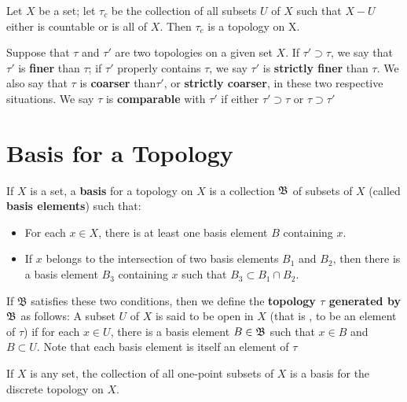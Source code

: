 \begin{exm}
		Let $X$ be a set; let $ \tau_c $ be the collection of all subsets $U$ of $X$ such that $ X - U$ either is countable or is all of $X$. Then $\tau_c$ is a topology on X.
\end{exm}

\begin{define}
	Suppose that $ \tau $ and $ \tau' $ are two topologies on a given set $X$. If $ \tau' \supset \tau $, we say that $ \tau' $ is \textbf{finer} than $ \tau$; if $\tau' $ properly contains $ \tau $, we say $ \tau'$ is \textbf{strictly finer} than $ \tau$. We also say that $ \tau $ is \textbf{coarser} than$ \tau' $, or \textbf{strictly coarser}, in these two respective situations. We say $ \tau $ is \textbf{comparable} with $ \tau' $ if either $ \tau' \supset \tau $ or $ \tau \supset \tau' $
\end{define}
\section*{Basis for a Topology}

\begin{define}
	If $X$ is a set, a \textbf{basis } for a topology on $X$ is a collection $ \mathfrak{B}$ of subsets of $X$ (called \textbf{basis elements}) such that:
	\begin{itemize}
		\item For each $x \in X $, there is at least one basis element $B$ containing $x$.
		\item If $x$ belongs to the intersection of two basis elements $B_1$ and $B_2$, then there is a basis element $B_3$ containing $x$ such that $ B_3 \subset B_1 \cap B_2 $.
	\end{itemize}
	If $\mathfrak{B}$ satisfies these two conditions, then we define the \textbf{topology $\tau$ generated by $\mathfrak{B}$} as follows: A subset $U$ of $X$ is said to be open in $X$ (that is , to be an element of $ \tau$) if for each $x \in U$, there is a basis element $B \in \mathfrak{B}$ such that $ x \in B$ and $ B \subset U$. Note that each basis element is itself an element of $ \tau $
\end{define}
\begin{exm}
	If $X$ is any set, the collection of all one-point subsets of $X$ is a basis for the discrete topology on $X$.
\end{exm}

